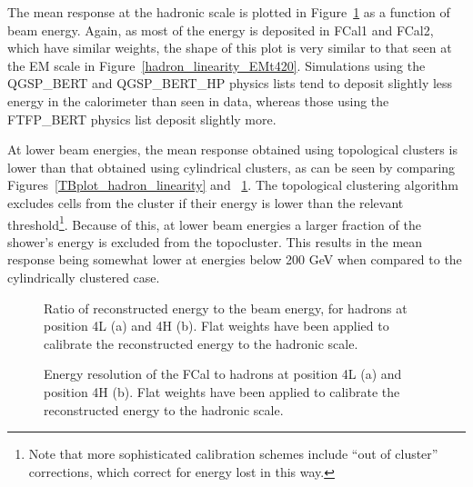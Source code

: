The mean response at the hadronic scale is plotted in Figure~\ref{hadron_linearity_t420} as a function of beam energy. Again, as most of the energy is deposited in FCal1 and FCal2, which have similar weights, the shape of this plot is very similar to that seen at the EM scale in Figure~\ref{hadron_linearity_EMt420}. Simulations using the QGSP\_BERT and QGSP\_BERT\_HP physics lists tend to deposit slightly less energy in the calorimeter than seen in data, whereas those using the FTFP\_BERT physics list deposit slightly more. 

At lower beam energies, the mean response obtained using topological clusters is lower than that obtained using cylindrical clusters, as can be seen by comparing Figures~\ref{TBplot_hadron_linearity} and ~\ref{hadron_linearity_t420}. The topological clustering algorithm excludes cells from the cluster if their energy is lower than the relevant threshold\footnote{Note that more sophisticated calibration schemes include ``out of cluster'' corrections, which correct for energy lost in this way.}. Because of this, at lower beam energies a larger fraction of the shower's energy is excluded from the topocluster. This results in the mean response being somewhat lower at energies below 200 GeV when compared to the cylindrically clustered case. 




\begin{figure}[!htb]
\begin{centering}
\caption[Reconstructed energy vs beam energy, hadrons (topoclusters)]{Ratio of reconstructed energy to the beam energy, for hadrons at position 4L (a) and 4H (b). Flat weights have been applied to calibrate the reconstructed energy to the hadronic scale.} 
\label{hadron_linearity_t420}
\end{centering}
\end{figure}



\begin{figure}[!htb]
\begin{centering}
\caption[Hadron energy resolution, topoclusters]{Energy resolution of the FCal to hadrons at position 4L (a) and position 4H (b). Flat weights have been applied to calibrate the reconstructed energy to the hadronic scale.} 
\label{hadron_resolution_t420}
\end{centering}
\end{figure}

